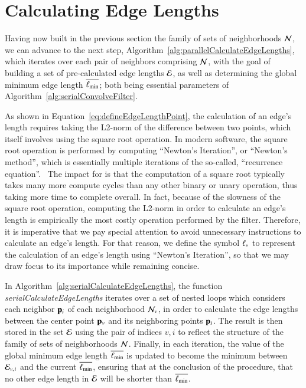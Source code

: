 %
%
%
%
\section{Calculating Edge Lengths}
\label{ch5sCEL}
Having now built in the previous section the family of sets of neighborhoods $\mathcal{N}$, we can advance to the next step, Algorithm~\ref{alg:parallelCalculateEdgeLengths}, which iterates over each pair of neighbors comprising $\mathcal{N}$, with the goal of building a set of pre-calculated edge lengths $\mathcal{E}$, as well as determining the global minimum edge length $\overline{\ell_\text{min}}$; both being essential parameters of Algorithm~\ref{alg:serialConvolveFilter}.

As shown in Equation~\ref{eq:defineEdgeLengthPoint}, the calculation of an edge's length requires taking the L2-norm of the difference between two points, which itself involves using the square root operation. In modern software, the square root operation is performed by computing ``Newton's Iteration'', or ``Newton's method'', which is essentially multiple iterations of the so-called, ``recurrence equation''.~\cite{Weisstein19b} The impact for  is that the computation of a square root typically takes many more compute cycles than  any other binary or unary operation, thus taking more time to complete overall. In fact, because of the slowness of the square root operation, computing the L2-norm in order to calculate an edge's length is empirically the most costly operation performed by the filter. Therefore, it is imperative that we pay special attention to avoid unnecessary instructions to calculate an edge's length. For that reason, we define the symbol $\ell_\ast$ to represent the calculation of an edge's length using ``Newton's Iteration'', so that we may draw focus to its importance while remaining concise.%

In Algorithm~\ref{alg:serialCalculateEdgeLengths}, the function \textit{serialCalculateEdgeLengths} iterates over a set of nested loops which considers each neighbor $\mathbf{p}_i$ of each neighborhood $\mathcal{N}_v$, in order to calculate the edge lengths between the center point $\mathbf{p}_v$ and its neighboring points $\mathbf{p}_i$. The result is then stored in the set $\mathcal{E}$ using the pair of indices $v, i$ to reflect the structure of the family of sets of neighborhoods $\mathcal{N}$. Finally, in each iteration, the value of the global minimum edge length $\overline{\ell_\text{min}}$ is updated to become the minimum between $\mathcal{E}_{v,\kern.75pt i}$ and the current $\overline{\ell_\text{min}}$, ensuring that at the conclusion of the procedure, that no other edge length in $\mathcal{E}$ will be shorter than $\overline{\ell_\text{min}}$.

